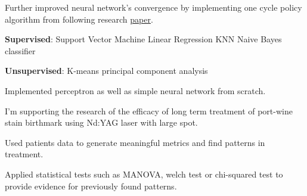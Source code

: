 \documentclass[]{CV}
\begin{document}
\begin{minipage}[t]{0.705\textwidth}
\begin{tightemize}
\item Further improved neural network's convergence by implementing one cycle policy algorithm from following research {\href{https://arxiv.org/abs/1506.01186}{paper}}.

\end{tightemize}
\sectionsep


\begin{tightemize}

\item  \textbf{Supervised}: Support Vector Machine \textbullet{} Linear Regression \textbullet{} KNN \textbullet{} Naive Bayes classifier

\item  \textbf{Unsupervised}: K-means \textbullet{} principal component analysis

\item Implemented perceptron as well as simple neural network from scratch.

\end{tightemize}
\sectionsep


\begin{tightemize}

\item  I'm supporting the research of the efficacy of long term treatment of port-wine stain birthmark using Nd:YAG laser with large spot.


\item Used patients data to generate meaningful metrics and find patterns in treatment.

\item Applied statistical tests such as MANOVA, welch test or chi-squared test to provide evidence for previously found patterns.

\end{tightemize}

%
%
%
%
%


\end{minipage}
\end{document}

